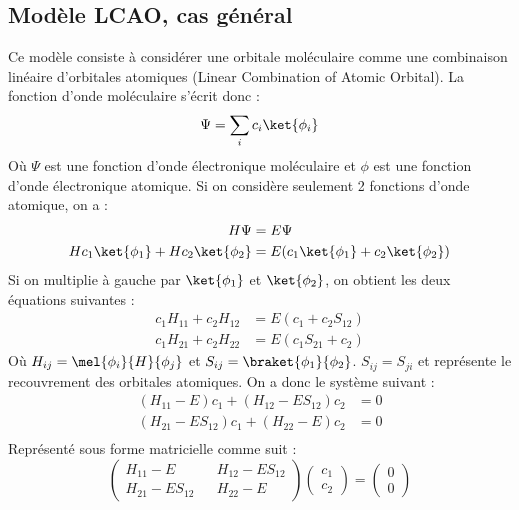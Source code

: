 \subsection{Modèle LCAO, cas général}

Ce modèle consiste à considérer une orbitale moléculaire comme une combinaison linéaire d’orbitales atomiques (Linear Combination of Atomic Orbital). La fonction d'onde moléculaire s'écrit donc :
\begin{equation*}
    \Psi = \sum\limits_i c_i\ket{\phi_i}
\end{equation*}
Où $\Psi$ est une fonction d'onde électronique moléculaire et $\phi$ est une fonction d'onde électronique atomique.\newline
Si on considère seulement 2 fonctions d'onde atomique, on a :
\begin{equation*}
    \begin{split}
        H\Psi &= E\Psi\\
        Hc_1\ket{\phi_1} + Hc_2\ket{\phi_2}  &= E(c_1\ket{\phi_1} + c_2\ket{\phi_2})
    \end{split}
\end{equation*}
Si on multiplie à gauche par $\ket{\phi_1}$ et $\ket{\phi_2}$, on obtient les deux équations suivantes : 
\begin{equation*}
    \begin{split}
        c_1H_{11} + c_2H_{12} &= E(c_1+c_2S_{12})\\
        c_1H_{21} + c_2H_{22} &= E(c_1S_{21}+c_2)
    \end{split}
\end{equation*}
Où $H_{ij} = \mel{\phi_i}{H}{\phi_j}$ et $S_{ij} = \braket{\phi_1}{\phi_2}$. $S_{ij} = S_{ji}$ et représente le recouvrement des orbitales atomiques.\newline
On a donc le système suivant :
\begin{equation*}
    \begin{split}
        (H_{11} - E)c_1 + (H_{12} - ES_{12})c_2 &= 0\\
        (H_{21} - ES_{12})c_1 + (H_{22} - E)c_2 &= 0\\
    \end{split}
\end{equation*}
Représenté sous forme matricielle comme suit :
\begin{equation*}
    \begin{pmatrix}
    H_{11}-E && H_{12}-ES_{12}\\
    H_{21}-ES_{12} && H_{22}-E
    \end{pmatrix}
    \begin{pmatrix}
    c_1\\
    c_2
    \end{pmatrix}
    = 
    \begin{pmatrix}
    0\\
    0
    \end{pmatrix}
\end{equation*}
